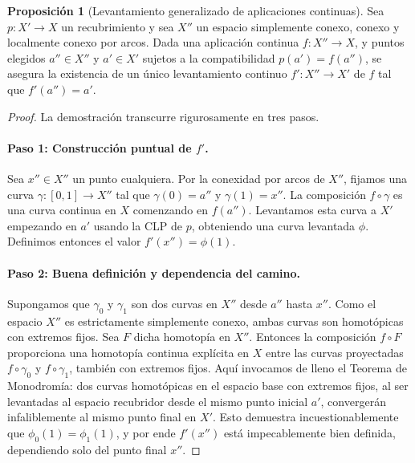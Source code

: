 \documentclass[11pt,a4paper]{article}
\theoremstyle{definition}
\newtheorem{proposicion}{Proposición}[section]
\theoremstyle{remark}
\numberwithin{equation}{section}
\begin{document}
\begin{proposicion}[Levantamiento generalizado de aplicaciones continuas]
Sea $p: X' \to X$ un recubrimiento y sea $X''$ un espacio simplemente conexo, conexo y localmente conexo por arcos. Dada una aplicación continua $f: X'' \to X$, y puntos elegidos $a'' \in X''$ y $a' \in X'$ sujetos a la compatibilidad $p(a') = f(a'')$, se asegura la existencia de un único levantamiento continuo $f': X'' \to X'$ de $f$ tal que $f'(a'') = a'$.
\end{proposicion}
\begin{proof}
La demostración transcurre rigurosamente en tres pasos.
\paragraph{Paso 1: Construcción puntual de $f'$.} Sea $x'' \in X''$ un punto cualquiera. Por la conexidad por arcos de $X''$, fijamos una curva $\gamma : [0,1] \to X''$ tal que $\gamma(0) = a''$ y $\gamma(1) = x''$. La composición $f \circ \gamma$ es una curva continua en $X$ comenzando en $f(a'')$. Levantamos esta curva a $X'$ empezando en $a'$ usando la CLP de $p$, obteniendo una curva levantada $\phi$. Definimos entonces el valor $f'(x'') = \phi(1)$.

\paragraph{Paso 2: Buena definición y dependencia del camino.} Supongamos que $\gamma_0$ y $\gamma_1$ son dos curvas en $X''$ desde $a''$ hasta $x''$. Como el espacio $X''$ es estrictamente simplemente conexo, ambas curvas son homotópicas con extremos fijos. Sea $F$ dicha homotopía en $X''$. Entonces la composición $f \circ F$ proporciona una homotopía continua explícita en $X$ entre las curvas proyectadas $f \circ \gamma_0$ y $f \circ \gamma_1$, también con extremos fijos. 
Aquí invocamos de lleno el Teorema de Monodromía: dos curvas homotópicas en el espacio base con extremos fijos, al ser levantadas al espacio recubridor desde el mismo punto inicial $a'$, convergerán infaliblemente al mismo punto final en $X'$. Esto demuestra incuestionablemente que $\phi_0(1) = \phi_1(1)$, y por ende $f'(x'')$ está impecablemente bien definida, dependiendo solo del punto final $x''$.


\end{proof}
\end{document}
